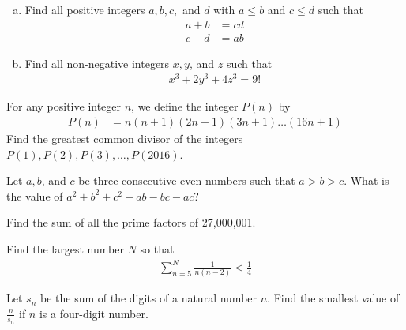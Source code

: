 \begin{problem} $ $
	\begin{enumerate}[(a)]
		\item Find all positive integers $a, b, c,$ and $d$ with $a \leq b$ and $c \leq d$ such that
			\begin{align*}
				a + b &= cd\\
				c + d &= ab
			\end{align*}
		\item Find all non-negative integers $x, y$, and $z$ such that
			\begin{align*}
				x^3 + 2y^3 + 4z^3 = 9!
			\end{align*}
	\end{enumerate}
\end{problem}

\begin{problem}
	For any positive integer $n$, we define the integer $P(n)$ by
		\begin{align*}
			P(n)
				& = n(n+1)(2n+1)(3n+1)\dots(16n+1)
		\end{align*}
	Find the greatest common divisor of the integers $P(1), P(2), P(3),\dots,P(2016)$. %
\end{problem}

\begin{problem}
	Let $a, b$, and $c$ be three consecutive even numbers such that $a > b > c$. What is the value of $a^2 + b^2 + c^2 - ab - bc - ac$?
\end{problem}

\begin{problem}
	Find the sum of all the prime factors of 27,000,001.
\end{problem}

\begin{problem}
	Find the largest number $N$ so that
	\begin{align*}
		\sum_{n=5}^{N} \frac{1}{n(n-2)} < \frac{1}{4}
	\end{align*}
\end{problem}

\begin{problem}
	Let $s_n$ be the sum of the digits of a natural number $n$. Find the smallest value of $\frac{n}{s_n}$ if $n$ is a four-digit number.
\end{problem}

